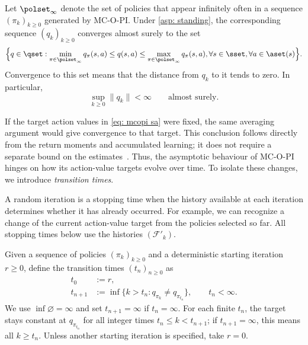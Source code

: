 \begin{lemma}
\label{thm: bounded limit sets}
Let $\polset_\infty$ denote the set of policies that appear infinitely often in a sequence $(\pi_k)_{k \ge 0}$ generated by MC-O-PI.
Under \autoref{asp: standing}, the corresponding sequence $(q_k)_{k \ge 0}$ converges almost surely to the set
\begin{align*}
    \Big\{
    q \in \qset :
    \min_{\pi \in \polset_\infty} q_\pi(s,a) \leq q(s,a) \leq \max_{\pi \in \polset_\infty} q_\pi(s,a), \forall s \in \sset, \forall a \in \aset(s)
    \Big\} .
\end{align*}
Convergence to this set means that the distance from $q_k$ to it tends to zero. In particular,
\[
\sup_{k\ge0}\|q_k\|<\infty\qquad\text{almost surely}.
\]
\end{lemma}

If the target action values in \eqref{eq: mcopi sa} were fixed, the same averaging argument would give convergence to that target. This conclusion follows directly from the return moments and accumulated learning; it does not require a separate bound on the estimates~\citep[Proposition~4.2]{Bertsekas1996Neuro-DynamicProgramming}.
Thus, the asymptotic behaviour of MC-O-PI hinges on how its action-value targets evolve over time. To isolate these changes, we introduce \textit{transition times}.

A random iteration is a stopping time when the history available at each iteration determines whether it has already occurred. For example, we can recognize a change of the current action-value target from the policies selected so far. All stopping times below use the histories $(\mathcal F'_k)$.

\begin{definition}
\label{def: transition times}
Given a sequence of policies $(\pi_k)_{k \ge 0}$ and a deterministic starting iteration $r\ge0$,
define the transition times $(t_n)_{n \ge 0}$ as
\begin{align*}
t_0 &:= r ,
\\
t_{n+1} &:= \inf\{k>t_n : q_{\pi_k} \neq q_{\pi_{t_n}} \},\qquad t_n<\infty.
\end{align*}
We use $\inf\varnothing=\infty$ and set $t_{n+1}=\infty$ if $t_n=\infty$.
For each finite $t_n$, the target stays constant at $q_{\pi_{t_n}}$ for all integer times $t_n\le k<t_{n+1}$; if $t_{n+1}=\infty$, this means all $k\ge t_n$. Unless another starting iteration is specified, take $r=0$.
\end{definition}

